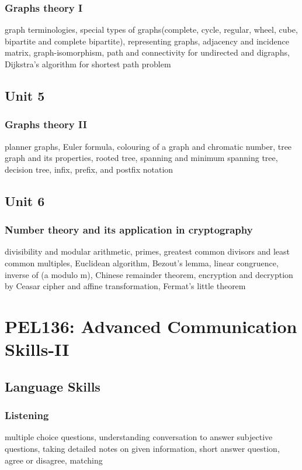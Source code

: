 \documentclass[twocolumn]{article}
\begin{document}
    \subsubsection*{Graphs theory I}
    graph terminologies, special types of graphs(complete, cycle, regular, wheel, cube, bipartite and complete bipartite), representing graphs, adjacency and incidence matrix, graph-isomorphism, path and connectivity for undirected and digraphs, Dijkstra's algorithm for shortest path problem
    \subsection*{Unit 5}
    \subsubsection*{Graphs theory II}
    planner graphs, Euler formula, colouring of a graph and chromatic number, tree graph and its properties, rooted tree, spanning and minimum spanning tree, decision tree, infix, prefix, and postfix notation
    \subsection*{Unit 6}
    \subsubsection*{Number theory and its application in cryptography}
    divisibility and modular arithmetic, primes, greatest common divisors and least common multiples, Euclidean algorithm, Bezout's lemma, linear congruence, inverse of (a modulo m), Chinese remainder theorem, encryption and decryption by Ceasar cipher and affine transformation, Fermat's little theorem
    \section*{PEL136: Advanced Communication Skills-II}
    \subsection*{Language Skills}
    \subsubsection*{Listening}
    multiple choice questions, understanding conversation to answer subjective questions, taking detailed notes on given information, short answer question, agree or disagree, matching
\end{document}
